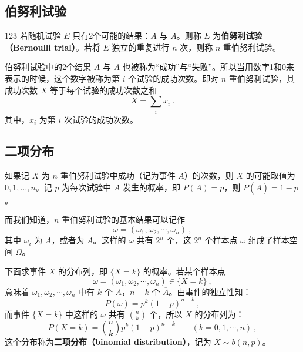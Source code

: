 
\subsection{伯努利试验}
\begin{definition}{}123
若随机试验 $E$ 只有2个可能的结果：$A$ 与 $\overline{A}$。则称 $E$ 为\textbf{伯努利试验（Bernoulli trial）}。若将 $E$ 独立的重复进行 $n$ 次，则称 $n$ 重伯努利试验。
\end{definition}
伯努利试验中的2个结果 $A$ 与 $\overline{A}$ 也被称为“成功”与“失败”。所以当用数字1和0来表示的时候，这个数字被称为第 $i$ 个试验的成功次数。即对 $n$ 重伯努利试验，其成功次数 $X$ 等于每个试验的成功次数之和
\begin{equation}
X=\sum_i x_i~.
\end{equation}
其中，$x_i$ 为第 $i$ 次试验的成功次数。
\subsection{二项分布}
如果记 $X $ 为 $n $ 重伯努利试验中成功（记为事件 $A$）的次数，则 $X $ 的可能取值为 $0,1,\dots,n$。记 $p $ 为每次试验中 $A $ 发生的概率，即 $P(A)=p$，则 $P(\overline{A})=1-p$。

而我们知道，$n$ 重伯努利试验的基本结果可以记作
\begin{equation}
\omega=\left(\omega_{1}, \omega_{2}, \cdots, \omega_{n}\right)~,
\end{equation}
其中 $\omega_i$ 为 $A$，或者为 $\overline{A}$。这样的 $\omega$ 共有 $2^n$ 个，这 $2^n$ 个样本点 $\omega$ 组成了样本空间 $\Omega$。

下面求事件 $X$ 的分布列，即 $\{X=k\}$ 的概率。若某个样本点
\begin{equation}
\omega=\left(\omega_{1}, \omega_{2}, \cdots, \omega_{n}\right) \in\{X=k\}~,
\end{equation}
意味着 $\omega_1,\omega_2,\cdots,\omega_n$ 中有 $k$ 个 $A$，$n-k$ 个 $\overline A$。由事件的独立性知：
\begin{equation}
P(\omega)=p^{k}(1-p)^{n-k}~,
\end{equation}
而事件 $\{X=k\}$ 中这样的 $\omega$ 共有 $\binom nk$ 个，所以 $X$ 的分布列为：
\begin{equation}
P(X=k)=\binom nk p^{k}(1-p)^{n-k} \qquad (k=0,1, \cdots, n)~,
\end{equation}
这个分布称为\textbf{二项分布（binomial distribution）}，记为 $X\sim b(n, p)$。

